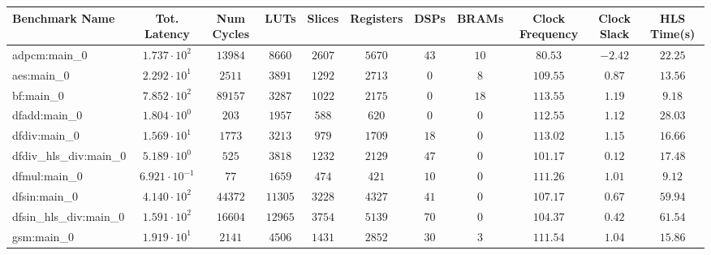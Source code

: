 \begin{tabular}{|l|c|c|c|c|c|c|c|c|c|c|}
\hline
Benchmark Name          & Tot. Latency            & Num Cycles & LUTs      & Slices    & Registers & DSPs    & BRAMs   & Clock Frequency & Clock Slack & HLS Time(s) \\
\hline
adpcm:main\_0           & $ 1.737 \cdot 10^{2}  $ & $ 13984  $ & $ 8660  $ & $ 2607  $ & $ 5670  $ & $ 43  $ & $ 10  $ & $ 80.53       $ & $ -2.42   $ & $ 22.25   $ \\
aes:main\_0             & $ 2.292 \cdot 10^{1}  $ & $ 2511   $ & $ 3891  $ & $ 1292  $ & $ 2713  $ & $ 0   $ & $ 8   $ & $ 109.55      $ & $ 0.87    $ & $ 13.56   $ \\
bf:main\_0              & $ 7.852 \cdot 10^{2}  $ & $ 89157  $ & $ 3287  $ & $ 1022  $ & $ 2175  $ & $ 0   $ & $ 18  $ & $ 113.55      $ & $ 1.19    $ & $ 9.18    $ \\
dfadd:main\_0           & $ 1.804 \cdot 10^{0}  $ & $ 203    $ & $ 1957  $ & $ 588   $ & $ 620   $ & $ 0   $ & $ 0   $ & $ 112.55      $ & $ 1.12    $ & $ 28.03   $ \\
dfdiv:main\_0           & $ 1.569 \cdot 10^{1}  $ & $ 1773   $ & $ 3213  $ & $ 979   $ & $ 1709  $ & $ 18  $ & $ 0   $ & $ 113.02      $ & $ 1.15    $ & $ 16.66   $ \\
dfdiv\_hls\_div:main\_0 & $ 5.189 \cdot 10^{0}  $ & $ 525    $ & $ 3818  $ & $ 1232  $ & $ 2129  $ & $ 47  $ & $ 0   $ & $ 101.17      $ & $ 0.12    $ & $ 17.48   $ \\
dfmul:main\_0           & $ 6.921 \cdot 10^{-1} $ & $ 77     $ & $ 1659  $ & $ 474   $ & $ 421   $ & $ 10  $ & $ 0   $ & $ 111.26      $ & $ 1.01    $ & $ 9.12    $ \\
dfsin:main\_0           & $ 4.140 \cdot 10^{2}  $ & $ 44372  $ & $ 11305 $ & $ 3228  $ & $ 4327  $ & $ 41  $ & $ 0   $ & $ 107.17      $ & $ 0.67    $ & $ 59.94   $ \\
dfsin\_hls\_div:main\_0 & $ 1.591 \cdot 10^{2}  $ & $ 16604  $ & $ 12965 $ & $ 3754  $ & $ 5139  $ & $ 70  $ & $ 0   $ & $ 104.37      $ & $ 0.42    $ & $ 61.54   $ \\
gsm:main\_0             & $ 1.919 \cdot 10^{1}  $ & $ 2141   $ & $ 4506  $ & $ 1431  $ & $ 2852  $ & $ 30  $ & $ 3   $ & $ 111.54      $ & $ 1.04    $ & $ 15.86   $ \\

\end{tabular}
